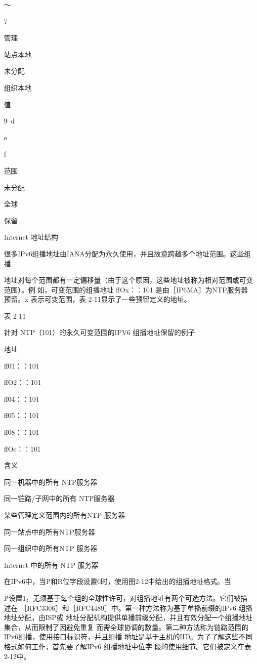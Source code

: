～

7

管理

站点本地

未分配

组织本地

值

9~d

e

f

范围

未分配

全球

保留

Internet 地址结构

很多IPv6组播地址由IANA分配为永久使用，并且故意跨越多个地址范围。这些组播

地址对每个范围都有一定偏移量（由于这个原因，这些地址被称为相对范围或可变范围）。例
如，可变范围的组播地址 ffOx：：101 是由［IP6MA］为NTP服务器预留。x 表示可变范围，表
2-11显示了一些预留定义的地址。

表 2-11

针对 NTP（101）的永久可变范围的IPV6 组播地址保留的例子

地址

ff01：：101

ffO2：：101

ff04：：101

ff05：：101

ff08：：101

ffOe：：101

含义

同一机器中的所有 NTP服务器

同一链路/子网中的所有 NTP服务器

某些管理定义范围内的所有NTP 服务器

同一站点中的所有NTP服务器

同一组织中的所有NTP 服务器

Internet 中的所有 NTP 服务器

在IPv6中，当P和R位字段设置0时，使用图2-12中给出的组播地址格式。当

P设置1，无须基于每个组的全球性许可，对组播地址有两个可选方法。它们被描述在
［RFC3306］和［RFC4489］中。第一种方法称为基于单播前缀的IPv6 组播地址分配，由ISP或
地址分配机构提供单播前缀分配，并且有效分配一个组播地址集合，从而限制了因避免重复
而需全球协调的数量。第二种方法称为链路范围的IPv6组播，使用接口标识符，并且组播
地址是基于主机的IID。为了了解这些不同格式如何工作，首先要了解IPv6 组播地址中位字
段的使用细节。它们被定义在表2-12中。

